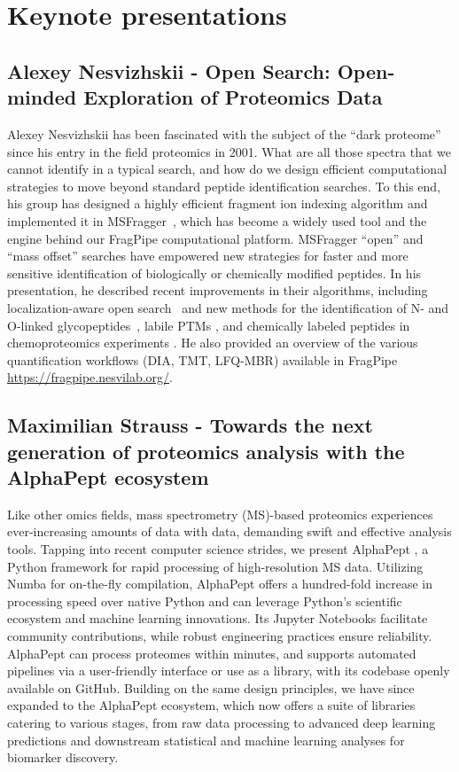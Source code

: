 \section{Keynote presentations}

\subsection{Alexey Nesvizhskii - Open Search: Open-minded Exploration of Proteomics Data}

Alexey Nesvizhskii  has been fascinated with the subject of the ``dark proteome'' since his entry in the field proteomics in 2001. What are all those spectra that we cannot identify in a typical search, and how do we design efficient computational strategies to move beyond standard peptide identification searches.  To this end, his group has designed a highly efficient fragment ion indexing algorithm and implemented it in MSFragger~\citep{pmid28394336}, which has become a widely used tool and the engine behind our FragPipe computational platform. MSFragger ``open'' and ``mass offset'' searches have empowered new strategies for faster and more sensitive identification of biologically or chemically modified peptides. In his presentation, he described recent improvements in their algorithms, including localization-aware open search~\citep{pmid32792501} and new methods for the identification of N- and O-linked glycopeptides~\citep{pmid33020657}, labile PTMs \citep{pmid37004988}, and chemically labeled peptides in chemoproteomics experiments \citep{pmid37438360}. He  also provided an overview of the various quantification workflows (DIA, TMT, LFQ-MBR) available in FragPipe \url{https://fragpipe.nesvilab.org/}.


\subsection{Maximilian Strauss - Towards the next generation of proteomics analysis with the AlphaPept ecosystem}

Like other omics fields, mass spectrometry (MS)-based proteomics experiences ever-increasing amounts of data with data, demanding swift and effective analysis tools. Tapping into recent computer science strides, we present AlphaPept \citep{Strauss2024}, a Python framework for rapid processing of high-resolution MS data. Utilizing Numba for on-the-fly compilation, AlphaPept offers a hundred-fold increase in processing speed over native Python and can leverage Python's scientific ecosystem and machine learning innovations. Its Jupyter Notebooks facilitate community contributions, while robust engineering practices ensure reliability. AlphaPept can process proteomes within minutes, and supports automated pipelines via a user-friendly interface or use as a library, with its codebase openly available on GitHub. Building on the same design principles, we have since expanded to the AlphaPept ecosystem, which now offers a suite of libraries catering to various stages, from raw data processing to advanced deep learning predictions and downstream statistical and machine learning analyses for biomarker discovery.


